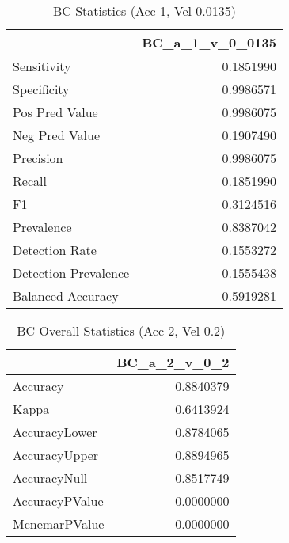 \documentclass[]{article}
\begin{document}
\begin{table}[!h]

\caption{\label{tab:bc_accuracy_chunk}BC Statistics (Acc 1, Vel 0.0135)}
\centering
\begin{tabular}[t]{lr}
\toprule
  & BC\_a\_1\_v\_0\_0135\\
\midrule
Sensitivity & 0.1851990\\
Specificity & 0.9986571\\
Pos Pred Value & 0.9986075\\
Neg Pred Value & 0.1907490\\
Precision & 0.9986075\\
\addlinespace
Recall & 0.1851990\\
F1 & 0.3124516\\
Prevalence & 0.8387042\\
Detection Rate & 0.1553272\\
Detection Prevalence & 0.1555438\\
Balanced Accuracy & 0.5919281\\
\bottomrule
\end{tabular}
\end{table}

\begin{table}[!h]

\caption{\label{tab:bc_accuracy_chunk}BC Overall Statistics (Acc 2, Vel 0.2)}
\centering
\begin{tabular}[t]{lr}
\toprule
  & BC\_a\_2\_v\_0\_2\\
\midrule
Accuracy & 0.8840379\\
Kappa & 0.6413924\\
AccuracyLower & 0.8784065\\
AccuracyUpper & 0.8894965\\
AccuracyNull & 0.8517749\\
\addlinespace
AccuracyPValue & 0.0000000\\
McnemarPValue & 0.0000000\\
\bottomrule
\end{tabular}
\end{table}
\end{document}
